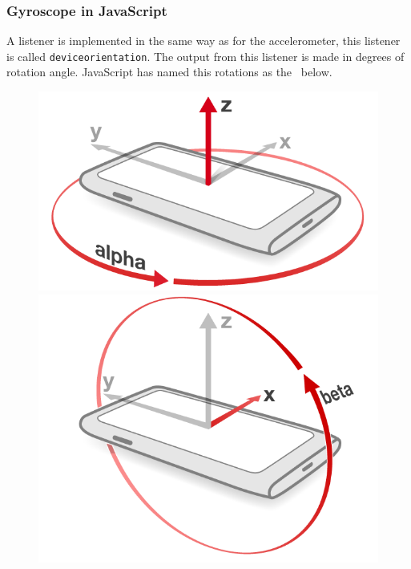 \subsubsection{Gyroscope in JavaScript}\label{subsec:gyroJS}
A listener is implemented in the same way as for the accelerometer, this listener is called  \texttt{deviceorientation}. The output from this listener is made in degrees of rotation angle. JavaScript has named this rotations as the~ below.
\begin{figure}[H]
  \hspace{-1cm}
  \centering
  \begin{minipage}[c]{.23\textwidth}
    \centering
    \includegraphics[scale=0.2]{img/device-alpha}
  \end{minipage}
  \hspace{1cm}
  \begin{minipage}[c]{.23\textwidth}
    \centering
    \includegraphics[scale=0.2]{img/device-beta}

\end{minipage}
\end{figure}
